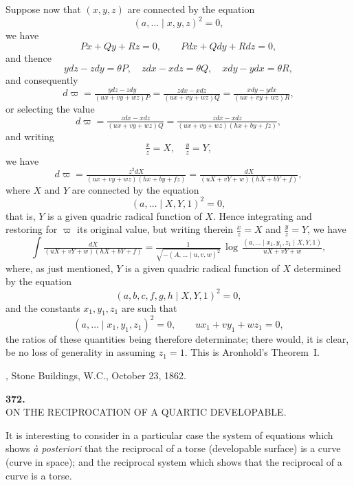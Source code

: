 \documentclass[11pt]{article}
\begin{document}
Suppose now that $(x,y,z)$ are connected by the equation
\[ (a,\ldots\mid x,y,z)^2 = 0, \]
we have
\[ Px + Qy + Rz = 0,\qquad Pdx + Qdy + Rdz = 0, \]
and thence
\[ ydz - zdy = \theta P,\quad zdx - xdz = \theta Q,\quad xdy - ydx = \theta R, \]
and consequently
\[ d\varpi = \tfrac{ydz - zdy}{(ux+vy+wz)P} = \tfrac{zdx-xdz}{(ux+vy+wz)Q} = \tfrac{xdy-ydx}{(ux+vy+wz)R}, \]
or selecting the value
\[ d\varpi = \tfrac{zdx-xdz}{(ux+vy+wz)Q} = \tfrac{zdx-xdz}{(ux+vy+wz)(hx+by+fz)}, \]
and writing
\[ \tfrac{x}{z} = X,\quad \tfrac{y}{z} = Y, \]
we have
\[ d\varpi = \tfrac{z^2 dX}{(ux+vy+wz)(hx+by+fz)} = \tfrac{dX}{(uX+vY+w)(hX+bY+f)}, \]
where $X$ and $Y$ are connected by the equation
\[ (a,\ldots\mid X,Y,1)^2 = 0, \]
that is, $Y$ is a given quadric radical function of $X$. Hence integrating and restoring for $\varpi$ its original value, but writing therein $\tfrac{x}{z}=X$ and $\tfrac{y}{z}=Y$, we have
\[ \int\tfrac{dX}{(uX+vY+w)(hX+bY+f)} = \tfrac{1}{\sqrt{-(A,\ldots\mid u,v,w)^2}}\,\log\,\tfrac{(a,\ldots\mid x_1,y_1,z_1\mid X,Y,1)}{uX+vY+w}, \]
where, as just mentioned, $Y$ is a given quadric radical function of $X$ determined by the equation
\[ (a,b,c,f,g,h\mid X,Y,1)^2 = 0, \]
and the constants $x_1, y_1, z_1$ are such that
\[ (a,\ldots\mid x_1,y_1,z_1)^2 = 0,\qquad ux_1 + vy_1 + wz_1 = 0, \]
the ratios of these quantities being therefore determinate; there would, it is clear, be no loss of generality in assuming $z_1 = 1$. This is Aronhold's Theorem~I.

\medskip
{}, Stone Buildings, W.C., October 23, 1862.

\bigskip

\begin{center}\textbf{372.}\\[2pt]
ON THE RECIPROCATION OF A QUARTIC DEVELOPABLE.\end{center}


\medskip

It is interesting to consider in a particular case the system of equations which shows \emph{\`a posteriori} that the reciprocal of a torse (developable surface) is a curve (curve in space); and the reciprocal system which shows that the reciprocal of a curve is a torse.
\end{document}

